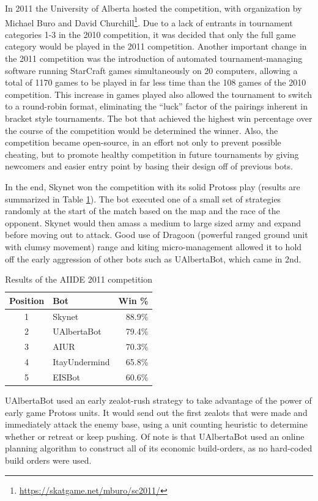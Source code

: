 \documentclass[journal]{IEEEtran}
\begin{document}
In 2011 the University of Alberta hosted the competition, with organization by Michael Buro and
David Churchill\footnote{\url{https://skatgame.net/mburo/sc2011/}}. Due to a lack of entrants in tournament categories 1-3 in the 2010 competition, it was
decided that only the full game category would be played in the 2011 competition. Another important
change in the 2011 competition was the introduction of automated tournament-managing software running
StarCraft games simultaneously on 20 computers, allowing a total of 1170 games to be played in far less
time than the 108 games of the 2010 competition. This increase in games played also allowed the tournament
to switch to a round-robin format, eliminating the ``luck'' factor of the pairings inherent in bracket
style tournaments. The bot that achieved the highest win percentage over the course of the competition would
be determined the winner. Also, the competition became open-source, in an effort not
only to prevent possible cheating, but to promote healthy competition in future tournaments by giving
newcomers and easier entry point by basing their design off of previous bots.

In the  end, Skynet  won the competition  with its solid  Protoss play
(results  are  summarized   in  Table  \ref{tab:aiide2011}).  The  bot
executed one of a small set of strategies randomly at the start of the
match based on the map and the race of the opponent. Skynet would then
amass a  medium to large  sized army and  expand before moving  out to
attack. Good  use of Dragoon (powerful ranged ground unit with clumsy movement) range and  kiting micro-management allowed
it to hold off the early aggression of other bots such as UAlbertaBot,
which came in 2nd.

\begin{table}[!b]
\caption{Results of the AIIDE 2011 competition}
\label{tab:aiide2011}
\centering
\begin{tabular}{|c|l|r|}
\hline
{\bfseries Position} & {\bfseries Bot} & {\bfseries Win \%} \\
\hline
1 & Skynet & 88.9\% \\
2 & UAlbertaBot & 79.4\% \\
3 & AIUR & 70.3\% \\
4 & ItayUndermind & 65.8\% \\
5 & EISBot & 60.6\% \\
\hline
\end{tabular}
\end{table}

UAlbertaBot used an early zealot-rush strategy to take advantage of the power of early game Protoss units. 
It would send out the first zealots that were made and immediately attack the enemy base, using a unit
counting heuristic to determine whether or retreat or keep pushing. Of note is that UAlbertaBot used an
online planning algorithm to construct all of its economic build-orders\cite{churchill2011build}, as no hard-coded build orders
were used. 
\end{document}
